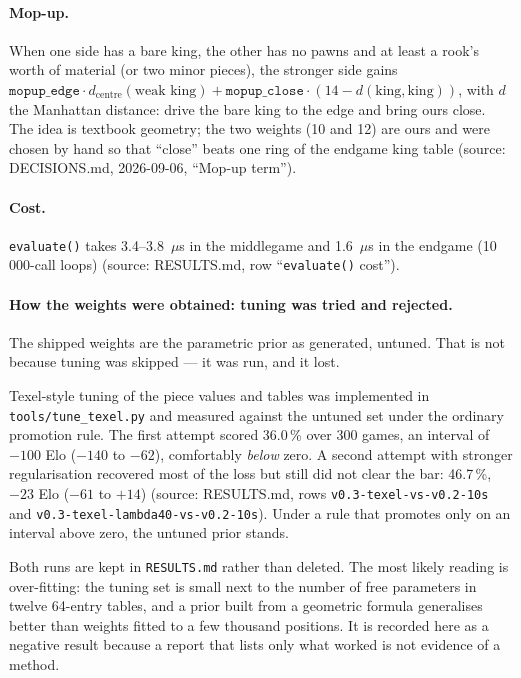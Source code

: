 \documentclass[11pt,a4paper]{article}
\newcommand{\src}[1]{{\small(source: #1)}}
\newcommand{\code}[1]{\texttt{#1}}
\begin{document}
\paragraph{Mop-up.} When one side has a bare king, the other has no pawns and at least a rook's worth of
material (or two minor pieces), the stronger side gains
$\code{mopup\_edge} \cdot d_{\mathrm{centre}}(\text{weak king}) + \code{mopup\_close} \cdot (14 -
d(\text{king}, \text{king}))$, with $d$ the Manhattan distance: drive the bare king to the edge and bring
ours close. The idea is textbook geometry; the two weights (10 and 12) are ours and were chosen by hand
so that ``close'' beats one ring of the endgame king table \src{DECISIONS.md, 2026-09-06, ``Mop-up term''}.

\paragraph{Cost.} \code{evaluate()} takes 3.4--3.8~$\mu$s in the middlegame and 1.6~$\mu$s in the endgame
(10\,000-call loops) \src{RESULTS.md, row ``\code{evaluate()} cost''}.

\paragraph{How the weights were obtained: tuning was tried and rejected.} The shipped weights are the
parametric prior as generated, untuned. That is not because tuning was skipped --- it was run, and it
lost.

Texel-style tuning of the piece values and tables was implemented in \code{tools/tune\_texel.py} and
measured against the untuned set under the ordinary promotion rule. The first attempt scored 36.0\,\% over
300 games, an interval of $-100$ Elo ($-140$ to $-62$), comfortably \emph{below} zero. A second attempt
with stronger regularisation recovered most of the loss but still did not clear the bar: 46.7\,\%, $-23$
Elo ($-61$ to $+14$) \src{RESULTS.md, rows \code{v0.3-texel-vs-v0.2-10s} and
\code{v0.3-texel-lambda40-vs-v0.2-10s}}. Under a rule that promotes only on an interval above zero, the
untuned prior stands.

Both runs are kept in \code{RESULTS.md} rather than deleted. The most likely reading is over-fitting: the
tuning set is small next to the number of free parameters in twelve 64-entry tables, and a prior built
from a geometric formula generalises better than weights fitted to a few thousand positions. It is
recorded here as a negative result because a report that lists only what worked is not evidence of a
method.
\end{document}
